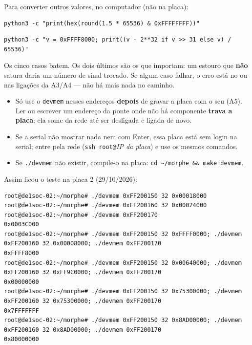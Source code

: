 \documentclass[11pt,a4paper,oneside]{article}
\newcommand{\arq}[1]{{\upshape\ttfamily\detokenize{#1}}}
\begin{document}
\begin{pronto}
Para converter outros valores, no computador (não na placa):
\begin{lstlisting}[style=sh]
python3 -c "print(hex(round(1.5 * 65536) & 0xFFFFFFFF))"
\end{lstlisting}
\begin{lstlisting}[style=sh]
python3 -c "v = 0xFFFF8000; print((v - 2**32 if v >> 31 else v) / 65536)"
\end{lstlisting}
\end{pronto}

\begin{confira}
Os cinco casos batem. Os dois últimos são os que importam: um estouro que
\textbf{não} satura daria um número de sinal trocado. Se algum caso falhar,
o erro está no \arq{soma_core.v} ou nas ligações da A3/A4 --- não há mais
nada no caminho.
\end{confira}

\begin{cuidado}
\begin{itemize}
  \item Só use o \texttt{devmem} nesses endereços \textbf{depois} de gravar a
    placa com o seu \arq{.sof} (A5). Ler ou escrever um endereço da ponte
    onde não há componente \textbf{trava a placa}: ela some da rede até ser
    desligada e ligada de novo.
  \item Se a serial não mostrar nada nem com Enter, essa placa está sem
    login na serial; entre pela rede (\texttt{ssh root@}\emph{IP da placa})
    e use os mesmos comandos.
  \item Se \texttt{./devmem} não existir, compile-o na placa:
    \texttt{cd \textasciitilde/morphe \&\& make devmem}.
\end{itemize}
\end{cuidado}

\begin{confira}
Assim ficou o teste na placa 2 (29/10/2026):
\begin{lstlisting}[style=sh]
root@de1soc-02:~/morphe# ./devmem 0xFF200150 32 0x00018000
root@de1soc-02:~/morphe# ./devmem 0xFF200160 32 0x00024000
root@de1soc-02:~/morphe# ./devmem 0xFF200170
0x0003C000
root@de1soc-02:~/morphe# ./devmem 0xFF200150 32 0xFFFF0000; ./devmem 0xFF200160 32 0x00008000; ./devmem 0xFF200170
0xFFFF8000
root@de1soc-02:~/morphe# ./devmem 0xFF200150 32 0x00640000; ./devmem 0xFF200160 32 0xFF9C0000; ./devmem 0xFF200170
0x00000000
root@de1soc-02:~/morphe# ./devmem 0xFF200150 32 0x75300000; ./devmem 0xFF200160 32 0x75300000; ./devmem 0xFF200170
0x7FFFFFFF
root@de1soc-02:~/morphe# ./devmem 0xFF200150 32 0x8AD00000; ./devmem 0xFF200160 32 0x8AD00000; ./devmem 0xFF200170
0x80000000
\end{lstlisting}
\end{confira}
\end{document}
